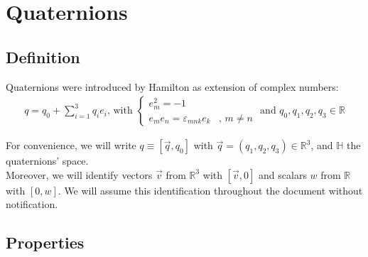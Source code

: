 \documentclass[class=report, float=false, crop=false]{standalone}
\begin{document}
\chapter{Quaternions}
\label{appendix:quaternions}

\section{Definition}

Quaternions were introduced by Hamilton as extension of complex numbers\cite{shoemake}:
\begin{align*}
q = q_0 + \sum_{i=1}^{3}q_i e_i\text{, with } \begin{cases} e_m^2 = -1& \\ e_me_n = \varepsilon_{mnk} e_k&\text{, } m \neq n \end{cases} \text{ and } q_0,q_1,q_2,q_3 \in \mathbb{R}
\end{align*}

For convenience, we will write $q \equiv [\vec{q},q_0]$ with $\vec{q} = (q_1,q_2,q_3) \in \mathbb{R}^3$, and $\mathbb{H}$ the quaternions' space.\\

Moreover, we will identify vectors $\vec{v}$ from $\mathbb{R}^3$ with $[\vec{v},0]$ and scalars $w$ from $\mathbb{R}$ with $[0,w]$. We will assume this identification throughout the document without notification.

\section{Properties}
\label{quat_properties}
\end{document}
